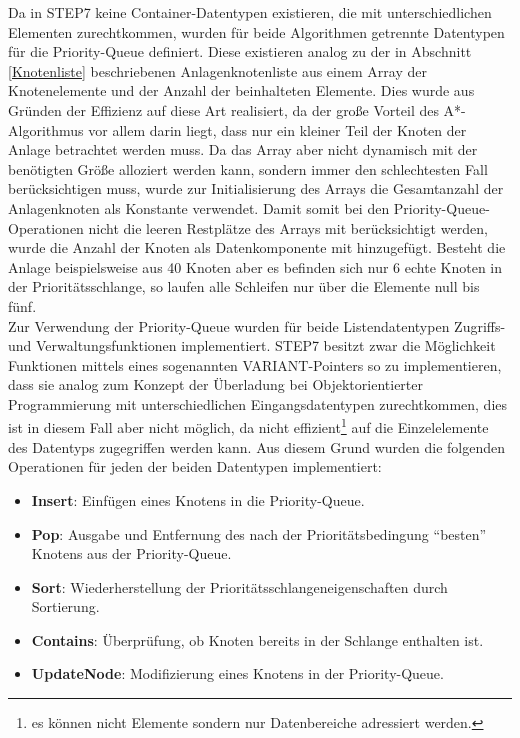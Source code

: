 			Da in \ac{STEP7} keine Container-Datentypen existieren, die mit unterschiedlichen Elementen zurechtkommen, wurden für beide Algorithmen getrennte Datentypen für die Priority-Queue definiert. Diese existieren analog zu der in Abschnitt \ref{Knotenliste} beschriebenen Anlagenknotenliste aus einem Array der Knotenelemente und der Anzahl der beinhalteten Elemente. Dies wurde aus Gründen der Effizienz auf diese Art realisiert, da der große Vorteil des A*-Algorithmus vor allem darin liegt, dass nur ein kleiner Teil der Knoten der Anlage betrachtet werden muss. Da das Array aber nicht dynamisch mit der benötigten Größe alloziert werden kann, sondern immer den schlechtesten Fall berücksichtigen muss, wurde zur Initialisierung des Arrays die Gesamtanzahl der Anlagenknoten als Konstante verwendet. Damit somit bei den Priority-Queue-Operationen nicht die leeren Restplätze des Arrays mit berücksichtigt werden, wurde die Anzahl der Knoten als Datenkomponente mit hinzugefügt. Besteht die Anlage beispielsweise aus 40 Knoten aber es befinden sich nur 6 echte Knoten in der Prioritätsschlange, so laufen alle Schleifen nur über die Elemente null bis fünf.
			\\[4pt]
			Zur Verwendung der Priority-Queue wurden für beide Listendatentypen Zugriffs- und Verwaltungsfunktionen implementiert. \ac{STEP7} besitzt zwar die Möglichkeit Funktionen mittels eines sogenannten VARIANT-Pointers so zu implementieren, dass sie analog zum Konzept der Überladung bei Objektorientierter Programmierung mit unterschiedlichen Eingangsdatentypen zurechtkommen\cite{STEP7Prog}, dies ist in diesem Fall aber nicht möglich, da nicht effizient\footnote{es können nicht Elemente sondern nur Datenbereiche adressiert werden.} auf die Einzelelemente des Datentyps zugegriffen werden kann. Aus diesem Grund wurden die folgenden Operationen für jeden der beiden Datentypen implementiert:
			
			\begin{itemize}
				\item \textbf{Insert}: Einfügen eines Knotens in die Priority-Queue.
				\item \textbf{Pop}: Ausgabe und Entfernung des nach der Prioritätsbedingung "`besten"' Knotens aus der Priority-Queue.
				\item \textbf{Sort}: Wiederherstellung der Prioritätsschlangeneigenschaften durch Sortierung.
				\item \textbf{Contains}: Überprüfung, ob Knoten bereits in der Schlange enthalten ist.
				\item \textbf{UpdateNode}: Modifizierung eines Knotens in der Priority-Queue.
			\end{itemize}
			
